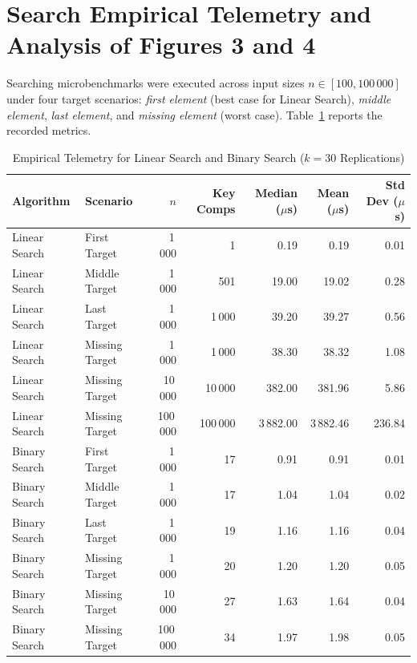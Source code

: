 \documentclass[11pt,a4paper,oneside]{report}
\theoremstyle{definition}
\begin{document}
\section{Search Empirical Telemetry and Analysis of Figures 3 and 4}
Searching microbenchmarks were executed across input sizes $n \in [100, 100\,000]$ under four target scenarios: \emph{first element} (best case for Linear Search), \emph{middle element}, \emph{last element}, and \emph{missing element} (worst case). Table~\ref{tab:search_telemetry_summary} reports the recorded metrics.

\begin{table}[htbp]
\centering
\caption{Empirical Telemetry for Linear Search and Binary Search ($k = 30$ Replications)}
\label{tab:search_telemetry_summary}
\small
\begin{tabular*}{\textwidth}{@{\extracolsep{\fill}}llrrrrr}
\toprule
\textbf{Algorithm} & \textbf{Scenario} & $n$ & \textbf{Key Comps} & \textbf{Median ($\mu$s)} & \textbf{Mean ($\mu$s)} & \textbf{Std Dev ($\mu$s)} \\
\midrule
Linear Search & First Target   & 1\,000   & 1      & 0.19    & 0.19    & 0.01 \\
Linear Search & Middle Target  & 1\,000   & 501    & 19.00   & 19.02   & 0.28 \\
Linear Search & Last Target    & 1\,000   & 1\,000 & 39.20   & 39.27   & 0.56 \\
Linear Search & Missing Target & 1\,000   & 1\,000 & 38.30   & 38.32   & 1.08 \\
Linear Search & Missing Target & 10\,000  & 10\,000& 382.00  & 381.96  & 5.86 \\
Linear Search & Missing Target & 100\,000 & 100\,000& 3\,882.00& 3\,882.46& 236.84 \\
\midrule
Binary Search & First Target   & 1\,000   & 17     & 0.91    & 0.91    & 0.01 \\
Binary Search & Middle Target  & 1\,000   & 17     & 1.04    & 1.04    & 0.02 \\
Binary Search & Last Target    & 1\,000   & 19     & 1.16    & 1.16    & 0.04 \\
Binary Search & Missing Target & 1\,000   & 20     & 1.20    & 1.20    & 0.05 \\
Binary Search & Missing Target & 10\,000  & 27     & 1.63    & 1.64    & 0.04 \\
Binary Search & Missing Target & 100\,000 & 34     & 1.97    & 1.98    & 0.05 \\
\bottomrule
\end{tabular*}
\end{table}
\end{document}
